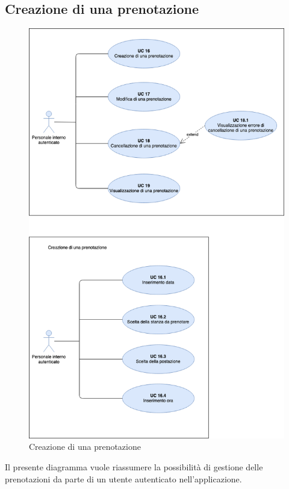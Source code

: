 \subsection{Creazione di una prenotazione}

\begin{figure}[H]
  \centering
    \includegraphics[width=\textwidth]{src/CasiDUso/immagini/UC-creazionePrenotazione.png}
  \caption{Creazione di una prenotazione}
\end{figure}

Il presente diagramma vuole riassumere la possibilità di gestione delle prenotazioni da parte di un utente autenticato nell’applicazione.

